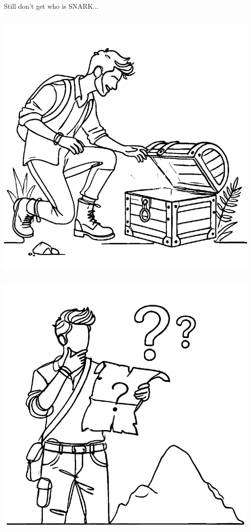 \documentclass{zkdl-presentation-template}
\begin{document}
\begin{frame}{Still don't get who is SNARK...}
\begin{columns}
            \begin{column}{0.2\textwidth}
                \includegraphics[width=\linewidth]{../presentations/images/lecture_8/uvefoundtreasure.png}
            \end{column}
        \end{columns}

        

        \begin{columns}
            \begin{column}{0.2\textwidth}
                \includegraphics[width=\linewidth]{../presentations/images/lecture_8/howtomakeaproof.png}
            \end{column}


\end{columns}
\end{frame}
\end{document}
